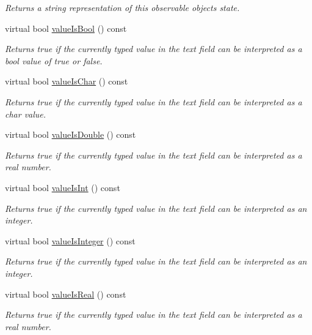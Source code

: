 \begin{DoxyCompactItemize}
\begin{DoxyCompactList}\small\item\em Returns a string representation of this observable object\textquotesingle{}s state. \end{DoxyCompactList}\item 
virtual bool \mbox{\hyperlink{classGTextField_a203f90275053ab957b1ea5a40dc3dd1e}{value\+Is\+Bool}} () const
\begin{DoxyCompactList}\small\item\em Returns true if the currently typed value in the text field can be interpreted as a bool value of true or false. \end{DoxyCompactList}\item 
virtual bool \mbox{\hyperlink{classGTextField_ac7a337b1e4c2f752a7f3fb634c92b442}{value\+Is\+Char}} () const
\begin{DoxyCompactList}\small\item\em Returns true if the currently typed value in the text field can be interpreted as a char value. \end{DoxyCompactList}\item 
virtual bool \mbox{\hyperlink{classGTextField_aa80caadc7498333f74a08b4cdc0528c1}{value\+Is\+Double}} () const
\begin{DoxyCompactList}\small\item\em Returns true if the currently typed value in the text field can be interpreted as a real number. \end{DoxyCompactList}\item 
virtual bool \mbox{\hyperlink{classGTextField_a4bccf08b3b712af3839106a1cbdc5d02}{value\+Is\+Int}} () const
\begin{DoxyCompactList}\small\item\em Returns true if the currently typed value in the text field can be interpreted as an integer. \end{DoxyCompactList}\item 
virtual bool \mbox{\hyperlink{classGTextField_af5aaf003739648d9aee89a17e715a57e}{value\+Is\+Integer}} () const
\begin{DoxyCompactList}\small\item\em Returns true if the currently typed value in the text field can be interpreted as an integer. \end{DoxyCompactList}\item 
virtual bool \mbox{\hyperlink{classGTextField_a29a5f540431d7993ff00eee5d2584a36}{value\+Is\+Real}} () const
\begin{DoxyCompactList}\small\item\em Returns true if the currently typed value in the text field can be interpreted as a real number. \end{DoxyCompactList}\end{DoxyCompactItemize}
